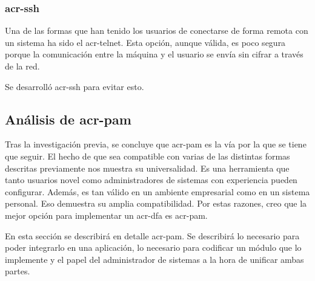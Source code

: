 \documentclass[titlepage, 12pt, a4paper]{article}
\begin{document}
\subsubsection{\gls{acr-ssh}}
Una de las formas que han tenido los usuarios de conectarse de forma remota con un sistema ha sido el \gls{acr-telnet}. Esta opción, aunque válida, es poco segura porque la comunicación entre la máquina y el usuario se envía sin cifrar a través de la red.\par Se desarrolló \gls{acr-ssh} para evitar esto.
\subsection{Análisis de \gls{acr-pam}}
Tras la investigación previa, se concluye que \gls{acr-pam} es la vía por la que se tiene que seguir. El hecho de que sea compatible con varias de las distintas formas descritas previamente nos muestra su universalidad. Es una herramienta que tanto usuarios novel como administradores de sistemas con experiencia pueden configurar. Además, es tan válido en un ambiente empresarial como en un sistema personal. Eso demuestra su amplia compatibilidad. Por estas razones, creo que la mejor opción para implementar un \gls{acr-dfa} es \gls{acr-pam}.\par
En esta sección se describirá en detalle \gls{acr-pam}. Se describirá lo necesario para poder integrarlo en una aplicación, lo necesario para codificar un módulo que lo implemente y el papel del administrador de sistemas a la hora de unificar ambas partes.
\end{document}
